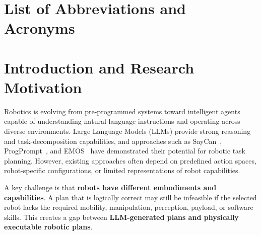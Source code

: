 \documentclass[12pt,a4paper]{article}
\begin{document}
\newpage
\tableofcontents

\newpage
\section*{List of Abbreviations and Acronyms}

\begin{singlespace}
\begin{acronym}[MoveIt2]
\end{acronym}
\end{singlespace}

\newpage
{}
\setcounter{page}{1}
\pagestyle{fancy}
\fancyhf{}
\fancyhead[R]{\small\thepage}
\renewcommand{\headrulewidth}{0.4pt}

\section{Introduction and Research Motivation}

Robotics is evolving from pre-programmed systems toward intelligent agents capable of understanding natural-language instructions and operating across diverse environments.
Large Language Models (LLMs) provide strong reasoning and task-decomposition capabilities, and approaches such as SayCan~\cite{saycan}, ProgPrompt~\cite{progprompt}, and EMOS~\cite{emos} have demonstrated their potential for robotic task planning.
However, existing approaches often depend on predefined action spaces, robot-specific configurations, or limited representations of robot capabilities.

A key challenge is that \textbf{robots have different embodiments and capabilities}.
A plan that is logically correct may still be infeasible if the selected robot lacks the required mobility, manipulation, perception, payload, or software skills.
This creates a gap between \textbf{LLM-generated plans and physically executable robotic plans}.
\end{document}
